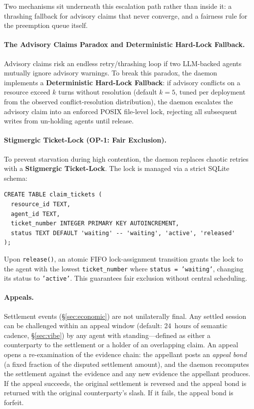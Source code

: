 \documentclass[11pt,a4paper]{article}
\theoremstyle{definition}
\theoremstyle{remark}
\begin{document}


Two mechanisms sit underneath this escalation path rather than inside it: a thrashing fallback for advisory claims that never converge, and a fairness rule for the preemption queue itself.

\paragraph{The Advisory Claims Paradox and Deterministic Hard-Lock Fallback.}
Advisory claims risk an endless retry/thrashing loop if two LLM-backed agents mutually ignore advisory warnings. To break this paradox, the daemon implements a \textbf{Deterministic Hard-Lock Fallback}: if advisory conflicts on a resource exceed $k$ turns without resolution (default $k = 5$, tuned per deployment from the observed conflict-resolution distribution), the daemon escalates the advisory claim into an enforced POSIX file-level lock, rejecting all subsequent writes from un-holding agents until release.

\paragraph{Stigmergic Ticket-Lock (OP-1: Fair Exclusion).}
To prevent starvation during high contention, the daemon replaces chaotic retries with a \textbf{Stigmergic Ticket-Lock}. The lock is managed via a strict SQLite schema:
\begin{lstlisting}[style=pdcode]
CREATE TABLE claim_tickets (
  resource_id TEXT,
  agent_id TEXT,
  ticket_number INTEGER PRIMARY KEY AUTOINCREMENT,
  status TEXT DEFAULT 'waiting' -- 'waiting', 'active', 'released'
);
\end{lstlisting}
Upon \texttt{release()}, an atomic FIFO lock-assignment transition grants the lock to the agent with the lowest \texttt{ticket\_number} where \texttt{status = 'waiting'}, changing its status to \texttt{'active'}. This guarantees fair exclusion without central scheduling.

\paragraph{Appeals.} Settlement events (\S\ref{sec:economic}) are not unilaterally final. Any settled session can be challenged within an appeal window (default: 24~hours of semantic cadence, \S\ref{sec:vibe}) by any agent with standing---defined as either a counterparty to the settlement or a holder of an overlapping claim. An appeal opens a re-examination of the evidence chain: the appellant posts an \emph{appeal bond} (a fixed fraction of the disputed settlement amount), and the daemon recomputes the settlement against the evidence and any new evidence the appellant produces. If the appeal succeeds, the original settlement is reversed and the appeal bond is returned with the original counterparty's slash. If it fails, the appeal bond is forfeit.
\end{document}
